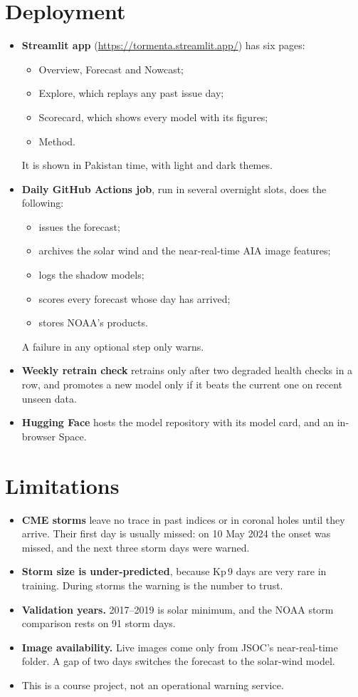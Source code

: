 \documentclass[11pt,a4paper]{article}
\begin{document}
\section{Deployment}
\begin{itemize}
\item \textbf{Streamlit app} (\url{https://tormenta.streamlit.app/}) has six pages:
  \begin{itemize}
  \item Overview, Forecast and Nowcast;
  \item Explore, which replays any past issue day;
  \item Scorecard, which shows every model with its figures;
  \item Method.
  \end{itemize}
  It is shown in Pakistan time, with light and dark themes.
\item \textbf{Daily GitHub Actions job}, run in several overnight slots, does the following:
  \begin{itemize}
  \item issues the forecast;
  \item archives the solar wind and the near-real-time AIA image features;
  \item logs the shadow models;
  \item scores every forecast whose day has arrived;
  \item stores NOAA's products.
  \end{itemize}
  A failure in any optional step only warns.
\item \textbf{Weekly retrain check} retrains only after two degraded health checks in a row, and promotes a new model
only if it beats the current one on recent unseen data.
\item \textbf{Hugging Face} hosts the model repository with its model card, and an in-browser Space.
\end{itemize}

\section{Limitations}
\begin{itemize}
\item \textbf{CME storms} leave no trace in past indices or in coronal holes until they arrive. Their first day is
usually missed: on 10 May 2024 the onset was missed, and the next three storm days were warned.
\item \textbf{Storm size is under-predicted}, because Kp\,9 days are very rare in training. During storms the warning
is the number to trust.
\item \textbf{Validation years.} 2017--2019 is solar minimum, and the NOAA storm comparison rests on 91 storm days.
\item \textbf{Image availability.} Live images come only from JSOC's near-real-time folder. A gap of two days
switches the forecast to the solar-wind model.
\item This is a course project, not an operational warning service.
\end{itemize}
\end{document}
